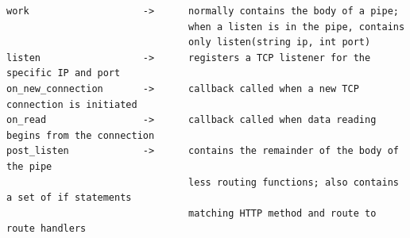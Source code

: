 \documentclass[./Report_main.tex]{subfiles}
\begin{document}
\begin{verbatim}
work                    ->      normally contains the body of a pipe;
                                when a listen is in the pipe, contains 
                                only listen(string ip, int port)
listen                  ->      registers a TCP listener for the specific IP and port
on_new_connection       ->      callback called when a new TCP connection is initiated
on_read                 ->      callback called when data reading begins from the connection
post_listen             ->      contains the remainder of the body of the pipe 
                                less routing functions; also contains a set of if statements 
                                matching HTTP method and route to route handlers
\end{verbatim}
\end{document}
